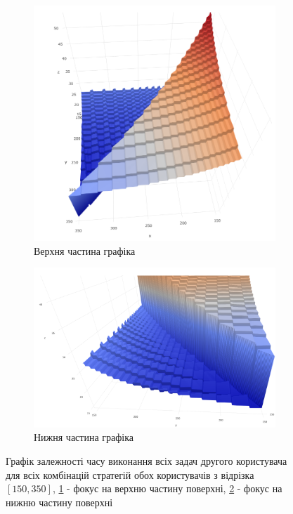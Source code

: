 \begin{figure}[H]
	\centering
	\begin{subfigure}[b]{0.45\textwidth}
		\includegraphics[width=\textwidth]{practice/img/two_users_surface_plot_150_350_top}
		\caption{Верхня частина графіка}
		\label{fig:two_users_surface_plot_150_350_top}
	\end{subfigure}
	\hfill
	\begin{subfigure}[b]{0.45\textwidth}
		\includegraphics[width=\textwidth]{practice/img/two_users_surface_plot_150_350_bot}
		\caption{Нижня частина графіка}
		\label{fig:two_users_surface_plot_150_350_bot}
	\end{subfigure}
	\caption{Графік залежності часу виконання всіх задач другого користувача для всіх комбінацій стратегій обох користувачів з відрізка $[150, 350]$, \ref{fig:two_users_surface_plot_150_350_top} - фокус на верхню частину поверхні, \ref{fig:two_users_surface_plot_150_350_bot} - фокус на нижню частину поверхні}
	\label{fig:two_users_surface_plot_150_350}
\end{figure}

